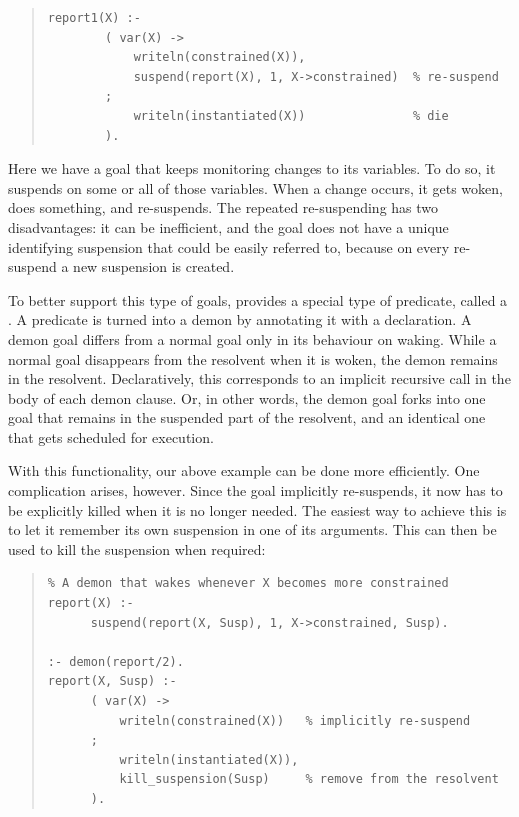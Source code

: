 {\begin{quote}
\begin{verbatim}
report1(X) :-
        ( var(X) ->
            writeln(constrained(X)),
            suspend(report(X), 1, X->constrained)  % re-suspend
        ;
            writeln(instantiated(X))               % die
        ).
\end{verbatim}
\end{quote}
Here we have a goal that keeps monitoring changes to its variables.
To do so, it suspends on some or all of those variables.
When a change occurs, it gets woken, does something, and re-suspends.
The repeated re-suspending has two disadvantages: it can be inefficient,
and the goal does not have a unique identifying suspension that could be
easily referred to, because on every re-suspend a new suspension is created.

To better support this type of goals, {\eclipse} provides a special type
of predicate, called a . A predicate is turned into a
demon by annotating it with a
declaration.
A demon goal differs from a normal goal only in its behaviour on
waking. While a normal goal disappears from the resolvent when it is
woken, the demon remains in the resolvent.
Declaratively, this corresponds to an implicit recursive call in
the body of each demon clause.
Or, in other words, the demon goal forks into one goal that remains in the
suspended part of the resolvent, and an identical one
that gets scheduled for execution.

With this functionality, our above example can be done more
efficiently. One complication arises, however. Since the goal
implicitly re-suspends, it now has to be explicitly killed when
it is no longer needed. The easiest way to achieve this is to
let it remember its own suspension in one of its arguments.
This can then be used to kill the suspension when required:
\begin{quote}
\begin{verbatim}
% A demon that wakes whenever X becomes more constrained
report(X) :-
      suspend(report(X, Susp), 1, X->constrained, Susp).

:- demon(report/2).
report(X, Susp) :-
      ( var(X) ->
          writeln(constrained(X))   % implicitly re-suspend
      ;
          writeln(instantiated(X)),
          kill_suspension(Susp)     % remove from the resolvent
      ).
\end{verbatim}
\end{quote}


}
